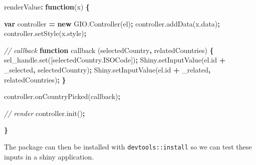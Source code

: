 \documentclass[
  10pt,
]{krantz}
\makeatletter
\newenvironment{Shaded}{\begin{snugshade}}{\end{snugshade}}
\newcommand{\AttributeTok}[1]{\textcolor[rgb]{0.61,0.61,0.61}{#1}}
\newcommand{\CommentTok}[1]{\textcolor[rgb]{0.37,0.37,0.37}{\textit{#1}}}
\newcommand{\KeywordTok}[1]{\textcolor[rgb]{0.27,0.27,0.27}{\textbf{#1}}}
\newcommand{\NormalTok}[1]{#1}
\newcommand{\OperatorTok}[1]{\textcolor[rgb]{0.43,0.43,0.43}{\textbf{#1}}}
\newcommand{\StringTok}[1]{\textcolor[rgb]{0.5,0.5,0.5}{#1}}
\newcommand{\VariableTok}[1]{\textcolor[rgb]{0,0,0}{#1}}
\newenvironment{kframe}{%
\medskip{}
\setlength{\fboxsep}{.8em}
 \def\at@end@of@kframe{}%
 \ifinner\ifhmode%
  \def\at@end@of@kframe{\end{minipage}}%
  \begin{minipage}{\columnwidth}%
 \fi\fi%
 \def\FrameCommand##1{\hskip\@totalleftmargin \hskip-\fboxsep
 \colorbox{shadecolor}{##1}\hskip-\fboxsep
     \hskip-\linewidth \hskip-\@totalleftmargin \hskip\columnwidth}%
 \MakeFramed {\advance\hsize-\width
   \@totalleftmargin\z@ \linewidth\hsize
   \@setminipage}}%
 {\par\unskip\endMakeFramed%
 \at@end@of@kframe}
\renewenvironment{Shaded}{\begin{kframe}}{\end{kframe}}
\makeatother
\begin{document}
\begin{Shaded}
\begin{Highlighting}[]
\NormalTok{renderValue}\OperatorTok{:} \KeywordTok{function}\NormalTok{(x) }\OperatorTok{\{}

  \KeywordTok{var}\NormalTok{ controller }\OperatorTok{=} \KeywordTok{new} \VariableTok{GIO}\NormalTok{.}\AttributeTok{Controller}\NormalTok{(el)}\OperatorTok{;}
  \VariableTok{controller}\NormalTok{.}\AttributeTok{addData}\NormalTok{(}\VariableTok{x}\NormalTok{.}\AttributeTok{data}\NormalTok{)}\OperatorTok{;}
  \VariableTok{controller}\NormalTok{.}\AttributeTok{setStyle}\NormalTok{(}\VariableTok{x}\NormalTok{.}\AttributeTok{style}\NormalTok{)}\OperatorTok{;}

  \CommentTok{// callback}
  \KeywordTok{function} \AttributeTok{callback}\NormalTok{ (selectedCountry}\OperatorTok{,}\NormalTok{ relatedCountries) }\OperatorTok{\{}
    \VariableTok{sel\_handle}\NormalTok{.}\AttributeTok{set}\NormalTok{([}\VariableTok{selectedCountry}\NormalTok{.}\AttributeTok{ISOCode}\NormalTok{])}\OperatorTok{;}
    \VariableTok{Shiny}\NormalTok{.}\AttributeTok{setInputValue}\NormalTok{(}\VariableTok{el}\NormalTok{.}\AttributeTok{id} \OperatorTok{+} \StringTok{\textquotesingle{}\_selected\textquotesingle{}}\OperatorTok{,}\NormalTok{ selectedCountry)}\OperatorTok{;}
    \VariableTok{Shiny}\NormalTok{.}\AttributeTok{setInputValue}\NormalTok{(}\VariableTok{el}\NormalTok{.}\AttributeTok{id} \OperatorTok{+} \StringTok{\textquotesingle{}\_related\textquotesingle{}}\OperatorTok{,}\NormalTok{ relatedCountries)}\OperatorTok{;}
  \OperatorTok{\}}

  \VariableTok{controller}\NormalTok{.}\AttributeTok{onCountryPicked}\NormalTok{(callback)}\OperatorTok{;}

  \CommentTok{// render}
  \VariableTok{controller}\NormalTok{.}\AttributeTok{init}\NormalTok{()}\OperatorTok{;}

\OperatorTok{\}}
\end{Highlighting}
\end{Shaded}

The package can then be installed with \texttt{devtools::install} so we can test these inputs in a shiny application.
\end{document}
